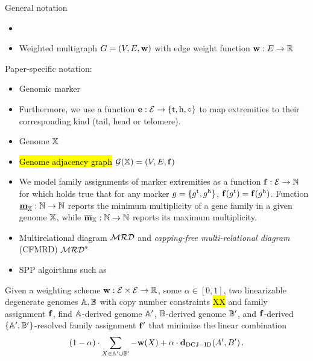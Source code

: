 \documentclass[runningheads]{llncs}
\begin{document}
General notation
\begin{itemize}
    \item 
    \item Weighted multigraph $G = (V, E, \mathbf{w})$ with edge weight function $\mathbf{w}: E \to \mathbb R$
\end{itemize}

Paper-specific notation:

\begin{itemize}
    \item Genomic marker 
    \item Furthermore, we use a function $\mathbf{e} : \mathcal{E} \to \{\textnormal{t}, \textnormal{h}, \circ\}$ to map extremities to their corresponding kind (tail, head or telomere). 
    \item Genome $\mathbb{X}$
    \item \hl{Genome adjacency graph} $\mathcal{G}(\mathbb{X}) = (V, E, \mathbf{f})$ 
    \item 
We model family assignments of marker extremities as a function $\mathbf{f}: \mathcal{E} \to \mathbb N$ for which holds true that for any marker $g = \{g^{\textnormal{t}}, g^{\textnormal{h}}\}$, $\mathbf{f}(g^{\textnormal{t}}) = \mathbf{f}(g^{\textnormal{h}})$.  
Function 
$\underline{\mathbf{m}}_{\mathbb{X}} : \mathbb N \to \mathbb N$ reports the minimum multiplicity of a gene family in a given genome $\mathbb{X}$, while $\overline{\mathbf{m}}_{\mathbb{X}}: \mathbb N \to \mathbb N$ reports its maximum multiplicity. 
    \item Multirelational diagram $\mathcal{MRD}$ and \emph{capping-free multi-relational diagram} (CFMRD) $\mathcal{MRD}^*$
\end{itemize}

\begin{itemize}
    \item SPP algoirthms such as 
\end{itemize}

\begin{problem}\label{prb:wdeg_dcj}
    Given a weighting scheme $\mathbf{w} : \mathcal{E} \times \mathcal{E} \to \mathbb R$, some $\alpha \in [0, 1]$, two linearizable degenerate genomes $\mathbb{A}, \mathbb{B}$ with copy number constraints \hl{XX} and family assignment $\mathbf{f}$, find $\mathbb{A}$-derived genome $\mathbb{A}'$, $\mathbb{B}$-derived genome $\mathbb{B}'$, and $\mathbf{f}$-derived $\{\mathbb{A}',\mathbb{B}'\}$-resolved family assignment $\mathbf{f}'$ that minimize the linear combination
    $$
    (1-\alpha) \cdot \sum_{X \in \mathbb{A}' \cup \mathbb{B}'} -\mathbf{w}(X) + \alpha \cdot \mathbf{d}_{\mathrm{DCJ-ID}}(A', B')\,.
    $$
\end{problem}
\end{document}
